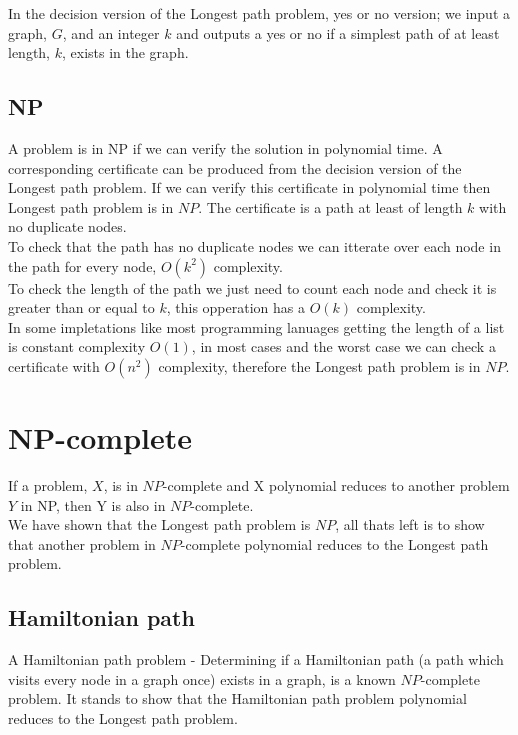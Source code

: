 \documentclass[a4paper,11pt]{article}
\begin{document}
    In the decision version of the Longest path problem, yes or no version; 
    we input a graph, $G$, and an integer $k$ and outputs a yes or no if a 
    simplest path of at least length, $k$, exists in the graph.
    \subsection{NP}
    A problem is in NP if we can verify the solution in polynomial time. A 
    corresponding certificate can be produced from the decision version of the 
    Longest path problem. If we can verify this certificate in polynomial time 
    then Longest path problem is in $NP$. The certificate is a path at least of 
    length $k$ with no duplicate nodes.\\ 
    To check that the path has no duplicate nodes we can itterate over each node
     in the path for every node, $O(k^2)$ complexity. 
    \\To check the length of the path we just need to count each node
    and check it is greater than or equal to $k$, this opperation has a $O(k)$ 
    complexity. 
    \\In some impletations like most programming lanuages getting the length of 
    a list is constant complexity $O(1)$, in most cases and the worst 
    case we can check a certificate with $O(n^2)$ complexity, therefore the
    Longest path problem is in $NP$.

\section{NP-complete}
If a problem, $X$, is in $NP$-complete and X polynomial reduces to another 
problem $Y$ in NP, then Y is also in $NP$-complete.\\
We have shown that the Longest path problem is $NP$, all thats left is to show 
that another problem in $NP$-complete polynomial reduces to the Longest path 
problem.
\pagebreak
\subsection{Hamiltonian path}
A Hamiltonian path problem - Determining if a Hamiltonian path (a path which 
visits every node in a graph once) exists in a graph, is a known $NP$-complete
problem. It stands to show that the Hamiltonian path problem polynomial reduces 
to the Longest path problem.
\end{document}
